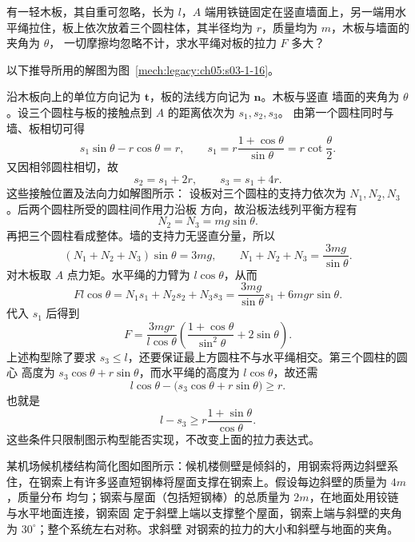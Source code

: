 {\begin{origexamplebox}{}\label{ch05:ex:s03-1-16}
有一轻木板，其自重可忽略，长为 $l$，$A$ 端用铁链固定在竖直墙面上，另一端用水
平绳拉住，板上依次放着三个圆柱体，其半径均为 $r$，质量均为 $m$，木板与墙面的夹角为 $\theta$，
一切摩擦均忽略不计，求水平绳对板的拉力 $F$ 多大？
\end{origexamplebox}

\begin{xesolution}
以下推导所用的解图为图~\ref{mech:legacy:ch05:s03-1-16}。

沿木板向上的单位方向记为 $\boldsymbol t$，板的法线方向记为 $\boldsymbol n$。木板与竖直
墙面的夹角为 $\theta$。设三个圆柱与板的接触点到 $A$ 的距离依次为 $s_1,s_2,s_3$。
由第一个圆柱同时与墙、板相切可得
\[
  s_1\sin\theta-r\cos\theta=r,
  \qquad
  s_1=r\frac{1+\cos\theta}{\sin\theta}=r\cot\frac\theta2.
\]
又因相邻圆柱相切，故
\[
  s_2=s_1+2r,
  \qquad
  s_3=s_1+4r.
\]
这些接触位置及法向力如解图所示：
\soldiagOneSixteen
设板对三个圆柱的支持力依次为 $N_1,N_2,N_3$。后两个圆柱所受的圆柱间作用力沿板
方向，故沿板法线列平衡方程有
\[
  N_2=N_3=mg\sin\theta.
\]
再把三个圆柱看成整体。墙的支持力无竖直分量，所以
\[
  (N_1+N_2+N_3)\sin\theta=3mg,
  \qquad
  N_1+N_2+N_3=\frac{3mg}{\sin\theta}.
\]
对木板取 $A$ 点力矩。水平绳的力臂为 $l\cos\theta$，从而
\[
  Fl\cos\theta=N_1s_1+N_2s_2+N_3s_3
  =\frac{3mg}{\sin\theta}s_1+6mgr\sin\theta.
\]
代入 $s_1$ 后得到
\[
  \boxed{F=\frac{3mgr}{l\cos\theta}
  \left(\frac{1+\cos\theta}{\sin^2\theta}+2\sin\theta\right)}.
\]
上述构型除了要求 $s_3\le l$，还要保证最上方圆柱不与水平绳相交。第三个圆柱的圆心
高度为 $s_3\cos\theta+r\sin\theta$，而水平绳的高度为 $l\cos\theta$，故还需
\[
  l\cos\theta-\bigl(s_3\cos\theta+r\sin\theta\bigr)\ge r.
\]
也就是
\[
  \boxed{l-s_3\ge r\frac{1+\sin\theta}{\cos\theta}}.
\]
这些条件只限制图示构型能否实现，不改变上面的拉力表达式。
\end{xesolution}

\begin{origexamplebox}{}\label{ch05:ex:s03-1-17}
某机场候机楼结构简化图如图所示：候机楼侧壁是倾斜的，用钢索将两边斜壁系
住，在钢索上有许多竖直短钢棒将屋面支撑在钢索上。假设每边斜壁的质量为 $4m$，质量分布
均匀；钢索与屋面（包括短钢棒）的总质量为 $2m$，在地面处用铰链与水平地面连接，钢索固
定于斜壁上端以支撑整个屋面，钢索上端与斜壁的夹角为 $30^\circ$；整个系统左右对称。求斜壁
对钢索的拉力的大小和斜壁与地面的夹角。
\end{origexamplebox}

}
